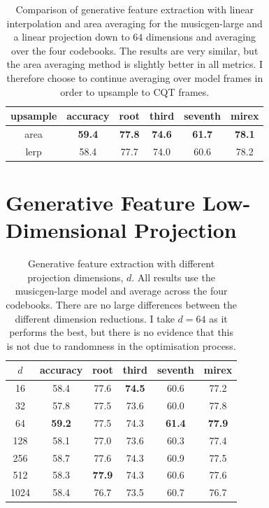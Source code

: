 \begin{table}[H]
    \centering
    \begin{tabular}{cccccc}
        \toprule
        upsample & accuracy & root & third & seventh & mirex  \\  
        \midrule
        area & \textbf{59.4} & \textbf{77.8} & \textbf{74.6} & \textbf{61.7} & \textbf{78.1} \\
        lerp & 58.4 & 77.7 & 74.0 & 60.6 & 78.2 \\
        \bottomrule
    \end{tabular}
    \caption{Comparison of generative feature extraction with linear interpolation and area averaging for the musicgen-large and a linear projection down to $64$ dimensions and averaging over the four codebooks. The results are very similar, but the area averaging method is slightly better in all metrics. I therefore choose to continue averaging over model frames in order to upsample to CQT frames.}\label{tab:linear_interpolation_vs_area_averaging}
\end{table}

\section{Generative Feature Low-Dimensional Projection}\label{app:projection_dimensionality}

\begin{table}[H]
    \centering
    \begin{tabular}{cccccc}
        \toprule
        $d$ & accuracy & root & third & seventh & mirex  \\  
        \midrule
        16   & 58.4       & 77.6       & \textbf{74.5} & 60.6       & 77.2       \\
        32   & 57.8       & 77.5       & 73.6          & 60.0       & 77.8       \\
        64   & \textbf{59.2} & 77.5    & 74.3          & \textbf{61.4} & \textbf{77.9} \\
        128  & 58.1       & 77.0       & 73.6          & 60.3       & 77.4       \\
        256  & 58.7       & 77.6       & 74.3          & 60.9       & 77.5       \\
        512  & 58.3       & \textbf{77.9} & 74.3      & 60.6       & 77.6       \\
        1024 & 58.4       & 76.7       & 73.5          & 60.7       & 76.7       \\ 
        \bottomrule
    \end{tabular}
    \caption{Generative feature extraction with different projection dimensions, $d$. All results use the musicgen-large model and average across the four codebooks. There are no large differences between the different dimension reductions. I take $d=64$ as it performs the best, but there is no evidence that this is not due to randomness in the optimisation process. }\label{tab:projection_dimensionality}
\end{table}


